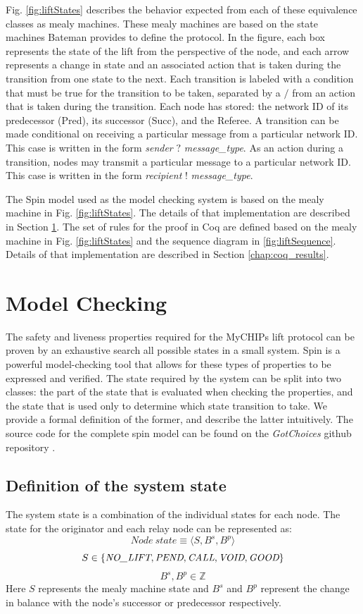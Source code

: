 \documentclass[runningheads]{llncs}
\newcommand{\nolift}{\emph{NO\_LIFT}}
\newcommand{\pend}{\emph{PEND}}
\newcommand{\call}{\emph{CALL}}
\newcommand{\void}{\emph{VOID}}
\newcommand{\good}{\emph{GOOD}}
\newcommand{\coderepository}{\emph{GotChoices} github repository \cite{bateman_myCHIPs}}
\begin{document}
Fig. \ref{fig:liftStates} describes the behavior expected from each of these equivalence classes as mealy machines.
These mealy machines are based on the state machines Bateman provides to define the protocol. \cite{bateman_state_machines} 
In the figure, each box represents the state of the lift from the perspective of the node, and each arrow represents a change in state and an associated action that is taken during the transition from one state to the next. Each transition is labeled with a condition that must be true for the transition to be taken, separated by a $/$ from an action that is taken during the transition. Each node has stored: the network ID of its predecessor (Pred), its successor (Succ), and the Referee. A transition can be made conditional on receiving a particular message from a particular network ID. This case is written in the form \emph{sender} $?$ \emph{message\_type}. As an action during a transition, nodes may transmit a particular message to a particular network ID. This case is written in the form \emph{recipient} $!$ \emph{message\_type}. 

The Spin model used as the model checking system is based on the mealy machine in Fig. \ref{fig:liftStates}. The details of that implementation are described in Section \ref{chap:model_checking_results}. The set of rules for the proof in Coq are defined based on the mealy machine in Fig. \ref{fig:liftStates} and the sequence diagram in \ref{fig:liftSequence}. Details of that implementation are described in Section \ref{chap:coq_results}.


\section{Model Checking} \label{chap:model_checking_results}
The safety and liveness properties required for the MyCHIPs lift protocol can be proven by an exhaustive search all possible states in a small system. Spin is a powerful model-checking tool that allows for these types of properties to be expressed and verified. The state required by the system can be split into two classes: the part of the state that is evaluated when checking the properties, and the state that is used only to determine which state transition to take. We provide a formal definition of the former, and describe the latter intuitively. The source code for the complete spin model can be found on the \coderepository.
\subsection{Definition of the system state}\label{sec:statedef}
The system state is a combination of the individual states for each node. The state for the originator and each relay node can be represented as:
$$Node~state \equiv \langle S, B^s, B^p \rangle$$
$$
S \in \{\nolift, \pend, \call, \void, \good\}
$$
$$
B^s, B^p \in \mathds{Z}
$$
Here $S$ represents the mealy machine state and $B^s$ and $B^p$ represent the change in balance with the node's successor or predecessor respectively.
\end{document}

